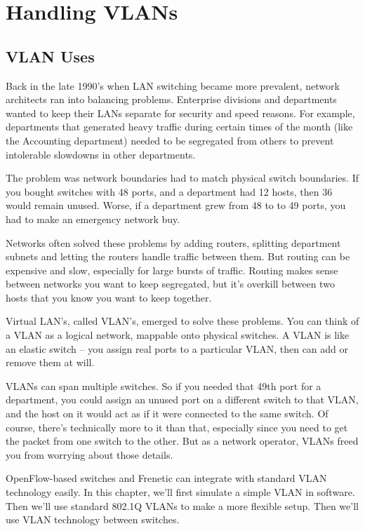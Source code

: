 
\chapter{Handling VLANs}
\label{chapter:handling_vlans}

\section{VLAN Uses}
\label{handling_vlans:uses}

Back in the late 1990's when LAN switching became more prevalent, network architects ran into balancing problems.
Enterprise divisions and departments wanted to keep their 
LANs separate for security and speed reasons.  For example, departments that generated heavy traffic 
during certain times of the month (like the Accounting department) needed to be segregated from others
to prevent intolerable slowdowns in other departments.  

The problem was network boundaries had to match physical switch boundaries.  If you bought switches with
48 ports, and a department had 12 hosts, then 36 would remain unused.  Worse, if a department grew from 
48 to to 49 ports, you had to make an emergency network buy.  

Networks often solved these problems by adding routers, splitting department subnets and letting the 
routers handle traffic between them.  But routing can be expensive and slow, especially for large 
bursts of traffic.  Routing makes sense between networks you want to keep segregated, but it's
overkill between two hosts that you know you want to keep together.

Virtual LAN's, called VLAN's, emerged to solve these problems.  You can think of a VLAN as a logical 
network, mappable onto physical switches.  A VLAN is like an elastic switch -- you assign real ports to 
a particular VLAN, then can add or remove them at will.  

VLANs can span multiple switches.  So if you needed that 49th port for a department, you could assign 
an unused port on a different switch to that VLAN, and the host on it would act as if it were connected to 
the same switch.  Of course, there's technically more to it than that, especially since you need to get the
packet from one switch to the other.  But as a network operator, VLANs freed you from worrying about
those details.  

OpenFlow-based switches and Frenetic can integrate with standard VLAN technology easily.  In this 
chapter, we'll first simulate a simple VLAN in software.  Then we'll use standard 802.1Q VLANs to 
make a more flexible setup.  Then we'll use VLAN technology between switches.  

